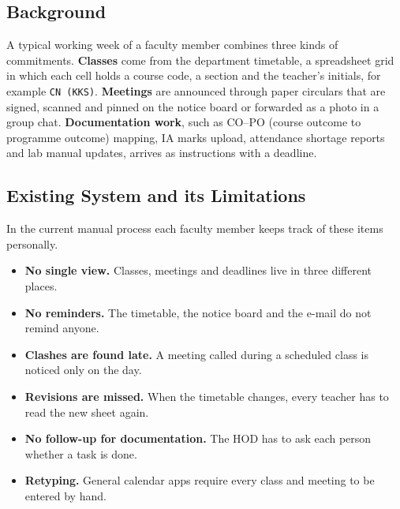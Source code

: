 
\subsection{Background}
A typical working week of a faculty member combines three kinds of commitments. \textbf{Classes} come from the department timetable, a spreadsheet grid in which each cell holds a course code, a section and the teacher's initials, for example \texttt{CN (KKS)}. \textbf{Meetings} are announced through paper circulars that are signed, scanned and pinned on the notice board or forwarded as a photo in a group chat. \textbf{Documentation work}, such as CO--PO (course outcome to programme outcome) mapping, IA marks upload, attendance shortage reports and lab manual updates, arrives as instructions with a deadline.

\subsection{Existing System and its Limitations}
In the current manual process each faculty member keeps track of these items personally.
\begin{itemize}
  \item \textbf{No single view.} Classes, meetings and deadlines live in three different places.
  \item \textbf{No reminders.} The timetable, the notice board and the e-mail do not remind anyone.
  \item \textbf{Clashes are found late.} A meeting called during a scheduled class is noticed only on the day.
  \item \textbf{Revisions are missed.} When the timetable changes, every teacher has to read the new sheet again.
  \item \textbf{No follow-up for documentation.} The HOD has to ask each person whether a task is done.
  \item \textbf{Retyping.} General calendar apps require every class and meeting to be entered by hand.
\end{itemize}


